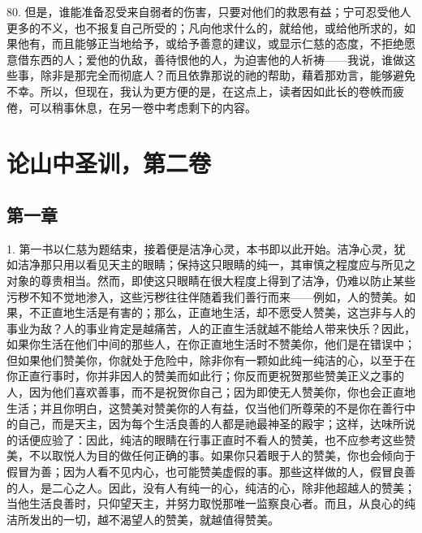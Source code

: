 80. 但是，谁能准备忍受来自弱者的伤害，只要对他们的救恩有益；宁可忍受他人更多的不义，也不报复自己所受的；凡向他求什么的，就给他，或给他所求的，如果他有，而且能够正当地给予，或给予善意的建议，或显示仁慈的态度，不拒绝愿意借东西的人；爱他的仇敌，善待恨他的人，为迫害他的人祈祷——我说，谁做这些事，除非是那完全而彻底人？而且依靠那说的祂的帮助，藉着那劝言，能够避免不幸。所以，但现在，我认为更方便的是，在这点上，读者因如此长的卷帙而疲倦，可以稍事休息，在另一卷中考虑剩下的内容。\par



\section{论山中圣训，第二卷}

\par


\subsection{第一章}

1. 第一书以仁慈为题结束，接着便是洁净心灵，本书即以此开始。洁净心灵，犹如洁净那只用以看见天主的眼睛；保持这只眼睛的纯一，其审慎之程度应与所见之对象的尊贵相当。然而，即使这只眼睛在很大程度上得到了洁净，仍难以防止某些污秽不知不觉地渗入，这些污秽往往伴随着我们善行而来——例如，人的赞美。如果，不正直地生活是有害的；那么，正直地生活，却不愿受人赞美，这岂非与人的事业为敌？人的事业肯定是越痛苦，人的正直生活就越不能给人带来快乐？因此，如果你生活在他们中间的那些人，在你正直地生活时不赞美你，他们是在错误中；但如果他们赞美你，你就处于危险中，除非你有一颗如此纯一纯洁的心，以至于在你正直行事时，你并非因人的赞美而如此行；你反而更祝贺那些赞美正义之事的人，因为他们喜欢善事，而不是祝贺你自己；因为即使无人赞美你，你也会正直地生活；并且你明白，这赞美对赞美你的人有益，仅当他们所尊荣的不是你在善行中的自己，而是天主，因为每个生活良善的人都是祂最神圣的殿宇；这样，达味所说的话便应验了：因此，纯洁的眼睛在行事正直时不看人的赞美，也不应参考这些赞美，不以取悦人为目的做任何正确的事。如果你只着眼于人的赞美，你也会倾向于假冒为善；因为人看不见内心，也可能赞美虚假的事。那些这样做的人，假冒良善的人，是二心之人。因此，没有人有纯一的心，纯洁的心，除非他超越人的赞美；当他生活良善时，只仰望天主，并努力取悦那唯一监察良心者。而且，从良心的纯洁所发出的一切，越不渴望人的赞美，就越值得赞美。\par

